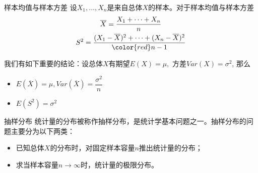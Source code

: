 
\begin{frame}

\begin{block}{样本均值与样本方差}
设$X_1,\ldots,X_n$是来自总体$X$的样本。对于样本均值与样本方差
\begin{gather*}
\overline{X} = \dfrac{X_1 + \cdots + X_n}{n} \\
S^2 = \dfrac{(X_1-\overline{X})^2 + \cdots + (X_n-\overline{X})^2}{\color{red} n-1}
\end{gather*}

我们有如下重要的结论：设总体$X$有期望$E(X) = \mu,$ 方差$Var(X) = \sigma^2$, 那么
\begin{itemize}
\item $E(\overline{X}) = \mu, Var(\overline{X}) = \dfrac{\sigma^2}{n}$
\item $E(S^2) = \sigma^2$
\end{itemize}
\end{block}

\end{frame}







\begin{frame}

\begin{block}{抽样分布}
统计量的分布被称作抽样分布，是统计学基本问题之一。抽样分布的问题主要分为以下两类：
\begin{itemize}
\item 已知总体$X$的分布时，对固定样本容量$n$推出统计量的分布；
\item 求当样本容量$n\to\infty$时，统计量的极限分布。
\end{itemize}
\end{block}

\end{frame}


